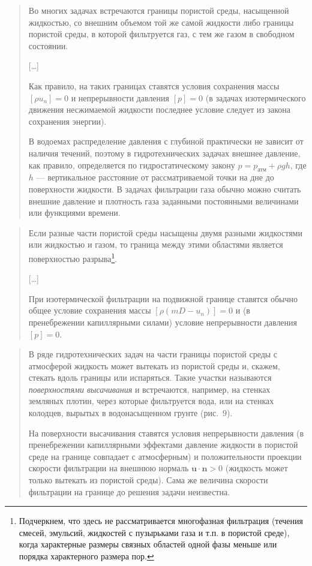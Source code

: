 \documentclass[12pt,a4paper]{article}
\newenvironment{textquote}{\begin{quote}\sloppy}{\end{quote}}
\begin{document}
\begin{textquote}
Во многих задачах встречаются границы пористой среды, насыщенной жидкостью, со внешним объемом той же самой жидкости либо границы пористой среды, в которой фильтруется газ, с тем же газом в свободном состоянии.

[…]

Как правило, на таких границах ставятся условия сохранения массы $[\rho u_n]=0$ и непрерывности давления $[p]=0$ (в задачах изотермического движения несжимаемой жидкости последнее условие следует из закона сохранения энергии).

В водоемах распределение давления с глубиной практически не зависит от наличия течений, поэтому в гидротехнических задачах внешнее давление, как правило, определяется по гидростатическому закону $p=p_{\text{атм}}+\rho gh$, где $h$ --- вертикальное расстояние от рассматриваемой точки на дне до поверхности жидкости. В задачах фильтрации газа обычно можно считать внешние давление и плотность газа заданными постоянными величинами или функциями времени.
\end{textquote}

\begin{textquote}
Если разные части пористой среды насыщены двумя разными жидкостями или жидкостью и газом, то граница между этими областями является поверхностью разрыва\footnote[1]{Подчеркнем, что здесь не рассматривается многофазная фильтрация (течения смесей, эмульсий, жидкостей с пузырьками газа и т.п. в пористой среде), когда характерные размеры связных областей одной фазы меньше или порядка характерного размера пор.}.

[…]

При изотермической фильтрации на подвижной границе ставятся обычно общее условие сохранения массы $[\rho(mD-u_n)]=0$ и (в пренебрежении капиллярными силами) условие непрерывности давления $[p]=0$.
\end{textquote}

\begin{textquote}
В ряде гидротехнических задач на части границы пористой среды с атмосферой жидкость может вытекать из пористой среды и, скажем, стекать вдоль границы или испаряться. Такие участки называются \textit{поверхностями высачивания} и встречаются, например, на стенках земляных плотин, через которые фильтруется вода, или на стенках колодцев, вырытых в водонасыщенном грунте (рис.~9).

На поверхности высачивания ставятся условия непрерывности давления (в пренебрежении капиллярными эффектами давление жидкости в пористой среде на границе совпадает с атмосферным) и положительности проекции скорости фильтрации на внешнюю нормаль $\boldsymbol{u}\cdot\boldsymbol{n}>0$ (жидкость может только вытекать из пористой среды). Сама же величина скорости фильтрации на границе до решения задачи неизвестна.
\end{textquote}
\end{document}
